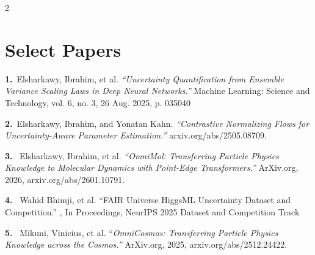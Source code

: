 \documentclass[lighthipster]{simplehipstercv}
\begin{document}
\begin{paracol}{2}
\vspace{-\baselineskip}
\vspace{-\baselineskip}
\vspace{-\baselineskip}
\section*{Select Papers}
\footnotesize{\textbf{1.}~Elsharkawy, Ibrahim, et al. \textit{“Uncertainty Quantification from Ensemble Variance Scaling Laws in Deep Neural Networks.”} Machine Learning: Science and Technology, vol. 6, no. 3, 26 Aug. 2025, p. 035040 

\textbf{2.}~Elsharkawy, Ibrahim, and Yonatan Kahn. \textit{“Contrastive Normalizing Flows for Uncertainty-Aware Parameter Estimation.”} arxiv.org/abs/2505.08709.

\textbf{3.}~ Elsharkawy, Ibrahim, et al. \textit{“OmniMol: Transferring Particle Physics Knowledge to Molecular Dynamics with Point-Edge Transformers.”} ArXiv.org, 2026, arxiv.org/abs/2601.10791. 

\textbf{4.}~ Wahid Bhimji, et al. “FAIR Universe HiggsML Uncertainty Dataset and Competition.” , In Proceedings, NeurIPS 2025  Dataset and Competition Track

\textbf{5.}~ Mikuni, Vinicius, et al. “\textit{OmniCosmos: Transferring Particle Physics Knowledge across the Cosmos.”} ArXiv.org, 2025, arxiv.org/abs/2512.24422.
\vspace{1em}

}
\end{paracol}
\end{document}
